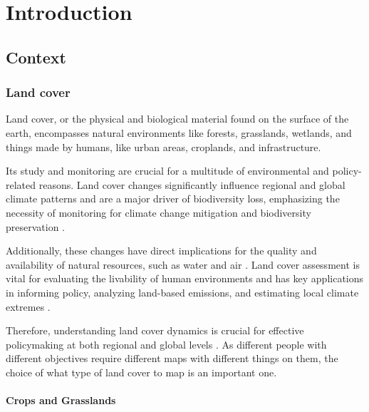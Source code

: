 \chapter[Introduction]{Introduction}
\label{cha:Chapter1}
\vspace*{\fill}


\newpage

\section{Context}


\subsection*{Land cover}

    Land cover, or the physical and biological material found on the surface of the earth, encompasses natural environments like forests, grasslands, wetlands, and things made by humans, like urban areas, croplands, and infrastructure. 
    
    Its study and monitoring are crucial for a multitude of environmental and policy-related reasons. Land cover changes significantly influence regional and global climate patterns and are a major driver of biodiversity loss, emphasizing the necessity of monitoring for climate change mitigation and biodiversity preservation \citep{pielke2002influence, houghton2012carbon, sala2000global, cbd2016indicators}. 
    
    Additionally, these changes have direct implications for the quality and availability of natural resources, such as water and air \citep{foley2005global}. Land cover assessment is vital for evaluating the livability of human environments \citep{levering2024landscape} and has key applications in informing policy, analyzing land-based emissions, and estimating local climate extremes \citep{duveiller2020, hong2021luemissions, sy2020}. 
    
    Therefore, understanding land cover dynamics is crucial for effective policymaking at both regional and global levels \citep{liu2020assessing, trisurat2019land, shumba2020effectiveness}. As different people with different objectives require different maps with different things on them, the choice of what type of land cover to map is an important one. 

    \subsubsection*{Crops and Grasslands}

